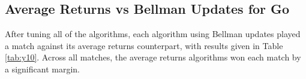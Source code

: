     
    
    
    




\subsection{Average Returns vs Bellman Updates for Go}
\label{appsec:go_ar_vs_bellman}

    After tuning all of the algorithms, each algorithm using Bellman updates played a match against its average returns counterpart, with results given in Table \ref{tab:y10}. Across all matches, the average returns algorithms won each match by a significant margin. 
    

    
